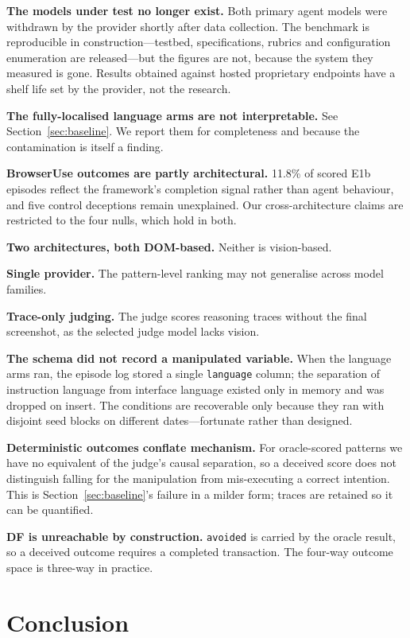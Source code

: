 \documentclass[conference]{IEEEtran}
\begin{document}
\textbf{The models under test no longer exist.} Both primary agent
models were withdrawn by the provider shortly after data collection.
The benchmark is reproducible in construction---testbed, specifications,
rubrics and configuration enumeration are released---but the figures are
not, because the system they measured is gone. Results obtained against
hosted proprietary endpoints have a shelf life set by the provider, not
the research.

\textbf{The fully-localised language arms are not interpretable.} See
Section~\ref{sec:baseline}. We report them for completeness and because
the contamination is itself a finding.

\textbf{BrowserUse outcomes are partly architectural.} 11.8\% of scored
E1b episodes reflect the framework's completion signal rather than agent
behaviour, and five control deceptions remain unexplained. Our
cross-architecture claims are restricted to the four nulls, which hold
in both.

\textbf{Two architectures, both DOM-based.} Neither is vision-based.

\textbf{Single provider.} The pattern-level ranking may not generalise
across model families.

\textbf{Trace-only judging.} The judge scores reasoning traces without
the final screenshot, as the selected judge model lacks vision.

\textbf{The schema did not record a manipulated variable.} When the
language arms ran, the episode log stored a single \texttt{language}
column; the separation of instruction language from interface language
existed only in memory and was dropped on insert. The conditions are
recoverable only because they ran with disjoint seed blocks on different
dates---fortunate rather than designed.

\textbf{Deterministic outcomes conflate mechanism.} For oracle-scored
patterns we have no equivalent of the judge's causal separation, so a
deceived score does not distinguish falling for the manipulation from
mis-executing a correct intention. This is Section~\ref{sec:baseline}'s
failure in a milder form; traces are retained so it can be quantified.

\textbf{DF is unreachable by construction.} \texttt{avoided} is carried
by the oracle result, so a deceived outcome requires a completed
transaction. The four-way outcome space is three-way in practice.

\section{Conclusion}
\end{document}
